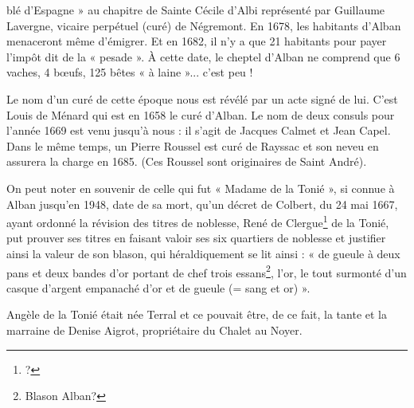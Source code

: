 blé d'Espagne » au chapitre de Sainte Cécile d'Albi représenté par
Guillaume Lavergne, vicaire perpétuel (curé) de Négremont. En 1678,
les habitants d'Alban menaceront même d'émigrer. Et en 1682, il n'y a
que 21 habitants pour payer l'impôt dit de la « pesade ». À cette date,
le cheptel d'Alban ne comprend que 6 vaches, 4 bœufs, 125 bêtes « à
laine »... c'est peu !

Le nom d'un curé de cette époque nous est révélé par un acte signé de
lui. C'est Louis de Ménard qui est en 1658 le curé d'Alban. Le nom de
deux consuls pour l'année 1669 est venu jusqu'à nous : il s'agit de
Jacques Calmet et Jean Capel. Dans le même temps, un Pierre Roussel
est curé de Rayssac et son neveu en assurera la charge en 1685.
(Ces Roussel sont originaires de Saint André).

On peut noter en souvenir de celle qui fut « Madame de la Tonié »,
si connue à Alban jusqu'en 1948, date de sa mort, qu'un décret de
Colbert, du 24 mai 1667, ayant ordonné la révision des titres de
noblesse, René de Clergue\footnote{?} de la Tonié, put prouver ses titres en faisant
valoir ses six quartiers de noblesse et justifier ainsi la valeur de son
blason, qui héraldiquement se lit ainsi : « de gueule à deux pans et
deux bandes d'or portant de chef trois essans\footnote{Blason Alban?}, l'or, le tout surmonté
d'un casque d'argent empanaché d'or et de gueule (= sang et or) ».

Angèle de la Tonié était née Terral et ce pouvait être, de ce fait,
la tante et la marraine de Denise Aigrot, propriétaire du Chalet au
Noyer.